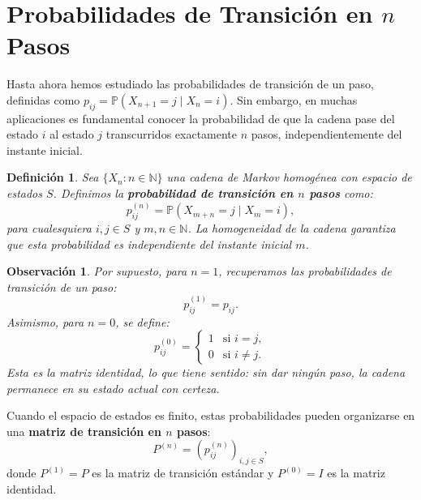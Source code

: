 \documentclass[12pt]{book}
\newtheorem{definition}{Definición}[chapter]
\newtheorem{remark}{Observación}[chapter]
\begin{document}
\section[Probabilidades de Transición en n Pasos]{Probabilidades de Transición en $n$ Pasos}

Hasta ahora hemos estudiado las probabilidades de transición de un paso, definidas como $p_{ij} = \mathbb{P}(X_{n+1} = j \mid X_n = i)$. Sin embargo, en muchas aplicaciones es fundamental conocer la probabilidad de que la cadena pase del estado $i$ al estado $j$ transcurridos exactamente $n$ pasos, independientemente del instante inicial.

\begin{definition}
Sea $\{X_n : n \in \mathbb{N}\}$ una cadena de Markov homogénea con espacio de estados $S$. Definimos la \textbf{probabilidad de transición en $n$ pasos} como:
\[
p_{ij}^{(n)} = \mathbb{P}(X_{m+n} = j \mid X_m = i),
\]
para cualesquiera $i, j \in S$ y $m, n \in \mathbb{N}$. La homogeneidad de la cadena garantiza que esta probabilidad es independiente del instante inicial $m$.
\end{definition}

\begin{remark}
Por supuesto, para $n = 1$, recuperamos las probabilidades de transición de un paso:
\[
p_{ij}^{(1)} = p_{ij}.
\]
Asimismo, para $n = 0$, se define:
\[
p_{ij}^{(0)} = \begin{cases} 1 & \text{si } i = j, \\ 0 & \text{si } i \neq j. \end{cases}
\]
Esta es la matriz identidad, lo que tiene sentido: sin dar ningún paso, la cadena permanece en su estado actual con certeza.
\end{remark}

Cuando el espacio de estados es finito, estas probabilidades pueden organizarse en una \textbf{matriz de transición en $n$ pasos}:
\[
P^{(n)} = (p_{ij}^{(n)})_{i,j \in S},
\]
donde $P^{(1)} = P$ es la matriz de transición estándar y $P^{(0)} = I$ es la matriz identidad.
\end{document}
